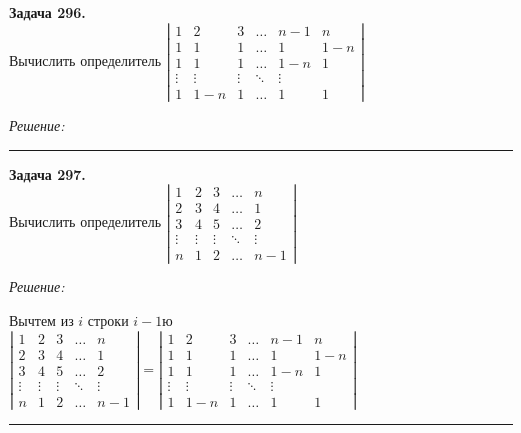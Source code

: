 \documentclass[a4paper, 12pt]{article}
\newenvironment{problem}[2][Задача]
    { \begin{mdframed}[backgroundcolor=gray!10] \textbf{#1 #2.} \\}
    {  \end{mdframed}}
\newenvironment{solution}
    {\textit{Решение: }}
    {\noindent\rule{7in}{1.5pt}}
\begin{document}
\begin{problem}{296}
Вычислить определитель 
$\left| \begin{array}{cccccc}1 & 2 & 3 & \ldots & n-1 & n \\ 1 & 1 & 1 & \ldots & 1 & 1-n\\ 1 & 1 & 1 & \ldots & 1-n & 1 \\ \vdots & \vdots & \vdots & \ddots & \vdots \\ 1 & 1-n & 1 & \ldots & 1 & 1 \end{array} \right|$
\end{problem}
\begin{solution}



\end{solution} 

\begin{problem}{297}
Вычислить определитель 
$\left| \begin{array}{ccccc}1 & 2 & 3 & \ldots & n \\ 2 & 3 & 4 & \ldots & 1 \\ 3 & 4 & 5 & \ldots & 2 \\ \vdots & \vdots & \vdots & \ddots & \vdots \\ n & 1 & 2 & \ldots & n-1 \end{array} \right|$
\end{problem}
\begin{solution}

Вычтем из $i$ строки $i-1$ю \\
$
\left|
\begin{array}{ccccc}
1 & 2 & 3 & \ldots & n \\
2 & 3 & 4 & \ldots & 1 \\
3 & 4 & 5 & \ldots & 2 \\
\vdots & \vdots & \vdots & \ddots & \vdots \\
n & 1 & 2 & \ldots & n-1 
\end{array}
\right|
=
\left|
\begin{array}{cccccc}
1 & 2 & 3 & \ldots & n-1 & n \\
1 & 1 & 1 & \ldots & 1 & 1-n \\
1 & 1 & 1 & \ldots & 1-n & 1 \\
\vdots & \vdots & \vdots & \ddots & \vdots \\
1 & 1-n & 1 & \ldots & 1 & 1
\end{array}
\right|
$

\end{solution} 
\end{document}
